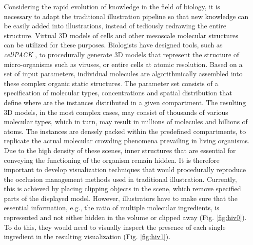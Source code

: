 Considering the rapid evolution of knowledge in the field of biology, it is necessary to adapt the traditional illustration pipeline so that new knowledge can be easily added into illustrations, instead of tediously redrawing the entire structure.
Virtual 3D models of cells and other mesoscale molecular structures can be utilized for these purposes.
Biologists have designed tools, such as \emph{cellPACK} \cite{cellpack}, to procedurally generate 3D models that represent the structure of micro-organisms such as viruses, or entire cells at atomic resolution.
Based on a set of input parameters, individual molecules are algorithmically assembled into these complex organic static structures. 
The parameter set consists of a specification of molecular types, concentrations and spatial distribution that define where are the instances distributed in a given compartment. 
The resulting 3D models, in the most complex cases, may consist of thousands of various molecular types, which in turn, may result in millions of molecules and billions of atoms.
The instances are densely packed within the predefined compartments, to replicate the actual molecular crowding phenomena prevailing in living organisms.
Due to the high density of these scenes, inner structures that are essential for conveying the functioning of the organism remain hidden.
It is therefore important to develop visualization techniques that would procedurally reproduce the occlusion management methods used in traditional illustration.
Currently, this is achieved by placing clipping objects in the scene, which remove specified parts of the displayed model. 
However, illustrators have to make sure that the essential information, e.g., the ratio of multiple molecular ingredients, is represented and not either hidden in the volume or clipped away (Fig. \ref{fig:hiv0}). 
To do this, they would need to visually inspect the presence of each single ingredient in the resulting visualization (Fig. \ref{fig:hiv1}).

